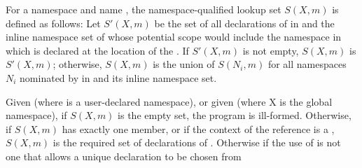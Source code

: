 \pnum
For a namespace  and name , the namespace-qualified lookup set
$S(X, m)$ is defined as follows: Let $S'(X, m)$ be the set of all
declarations of  in  and the inline namespace set of
whose potential scope
would include the namespace in which  is declared
at the location of the .
If $S'(X, m)$ is not empty, $S(X, m)$
is $S'(X, m)$; otherwise, $S(X, m)$ is the union of $S(N_i, m)$ for
all namespaces $N_i$ nominated by  in
 and its inline namespace set.

\pnum
Given  (where  is a user-declared namespace), or
given  (where X is the global namespace), if
$S(X, m)$ is the empty set, the program is ill-formed. Otherwise, if
$S(X, m)$ has exactly one member, or if the context of the reference is
a , $S(X, m)$
is the
required set of declarations of . Otherwise if the use of
 is not one that allows a unique declaration to be chosen from
